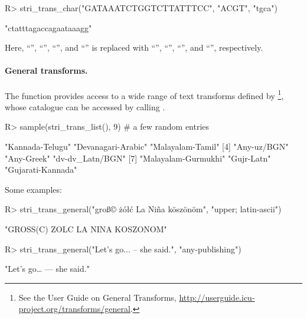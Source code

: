 \documentclass[nojss]{jss}
\begin{document}
\begin{Schunk}
\begin{Sinput}
R> stri_trans_char("GATAAATCTGGTCTTATTTCC", "ACGT", "tgca")
\end{Sinput}
\begin{Soutput}
[1] "ctatttagaccagaataaagg"
\end{Soutput}
\end{Schunk}

Here, ``'', ``'', ``'', and ``''
is replaced with
``'', ``'', ``'', and ``'', respectively.



\paragraph{General transforms.}
The  function
provides access to a wide range of text transforms
defined by \footnote{
See the  User Guide on {General Transforms},
\url{http://userguide.icu-project.org/transforms/general}.
}, whose catalogue can be accessed by calling
.

\begin{Schunk}
\begin{Sinput}
R> sample(stri_trans_list(), 9)  # a few random entries
\end{Sinput}
\begin{Soutput}
[1] "Kannada-Telugu"     "Devanagari-Arabic"  "Malayalam-Tamil"
[4] "Any-uz/BGN"         "Any-Greek"          "dv-dv_Latn/BGN"
[7] "Malayalam-Gurmukhi" "Gujr-Latn"          "Gujarati-Kannada"
\end{Soutput}
\end{Schunk}

Some examples:


\begin{Schunk}
\begin{Sinput}
R> stri_trans_general("groß© żółć La Niña köszönöm", "upper; latin-ascii")
\end{Sinput}
\begin{Soutput}
[1] "GROSS(C) ZOLC LA NINA KOSZONOM"
\end{Soutput}
\begin{Sinput}
R> stri_trans_general("Let's go... -- she said.", "any-publishing")
\end{Sinput}
\begin{Soutput}
[1] "Let’s go… — she said."
\end{Soutput}
\end{Schunk}
\end{document}
